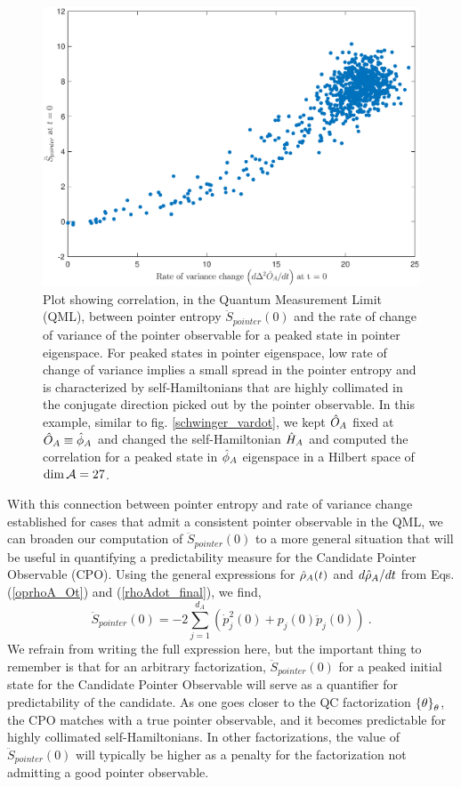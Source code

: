 \documentclass[aps,pra,onecolumn,nofootinbib,notitlepage,11pt,tightenlines]{revtex4-1}
\begin{document}
\begin{figure}[h]
\includegraphics[width= \textwidth]{schwinger_pointer}
\caption{Plot showing correlation, in the Quantum Measurement Limit (QML), between pointer entropy $\ddot{S}_{pointer}(0)$ and the rate of change of variance of the pointer observable for a peaked state in pointer eigenspace. For peaked states in pointer eigenspace, low rate of change of variance implies a small spread in the pointer entropy and is characterized by self-Hamiltonians that are highly collimated in the conjugate direction picked out by the pointer observable.  In this example, similar to fig. \ref{schwinger_vardot}, we kept $\hat{O}_{A}$ fixed at $\hat{O}_{A} \equiv \hat{\phi}_{A}$ and changed the self-Hamiltonian $\hat{H}_{A}$ and computed the correlation for a peaked state in $\hat{\phi}_{A}$ eigenspace in a Hilbert space of $\textrm{dim\,} \mathcal{A} = 27$.}
\label{schwinger_pointer}
\end{figure}

With this connection between pointer entropy and rate of variance change established for cases that admit a consistent pointer observable in the QML, we can broaden our computation of $\ddot{S}_{pointer}(0)$ to a more general situation that will be useful in quantifying a predictability measure for the Candidate Pointer Observable (CPO).
Using the general expressions for $\hat{\rho}_{A}(t)$ and $d\hat{\rho}_{A}/dt$ from Eqs. (\ref{oprhoA_Ot}) and (\ref{rhoAdot_final}), we find,
\begin{equation}
\label{Spointerdoubledot_general}
\ddot{S}_{pointer}(0) = -2\sum_{j=1}^{d_{A}}\left(\dot{p}^{2}_{j}(0) + p_{j}(0) \ddot{p}_{j}(0)\right) \: .
\end{equation}
We refrain from writing the full expression here, but the important thing to remember is that for an arbitrary factorization, $\ddot{S}_{pointer}(0)$ for a peaked initial state for the Candidate Pointer Observable will serve as a quantifier for predictability of the candidate. As one goes closer to the QC factorization ${\{\theta\}}_{\theta}$, the CPO matches with a true pointer observable, and it becomes predictable for highly collimated self-Hamiltonians. In other factorizations, the value of $\ddot{S}_{pointer}(0)$ will typically be higher as a penalty for the factorization not admitting a good pointer observable.
\end{document}
